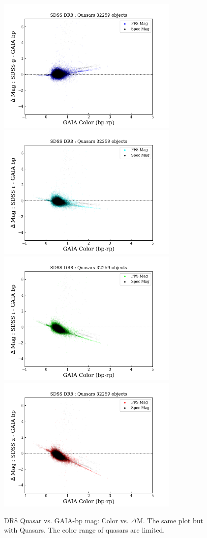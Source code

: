 \documentclass[apj,twocolumn]{aastex631}
\begin{document}
\begin{figure}%
\begin{center}
\includegraphics[angle=0,width=8.9cm]{figures/20220812_color_dmag_g_bp_dr8quasar.png}
\includegraphics[angle=0,width=8.9cm]{figures/20220812_color_dmag_r_bp_dr8quasar.png}
\includegraphics[angle=0,width=8.9cm]{figures/20220812_color_dmag_i_bp_dr8quasar.png}
\includegraphics[angle=0,width=8.9cm]{figures/20220812_color_dmag_z_bp_dr8quasar.png}
\caption{DR8 Quasar vs. GAIA-bp mag: Color vs. $\Delta$M.  The same plot but with Quasars.  The color range of quasars are limited.}
\end{center}
\end{figure}
\end{document}
